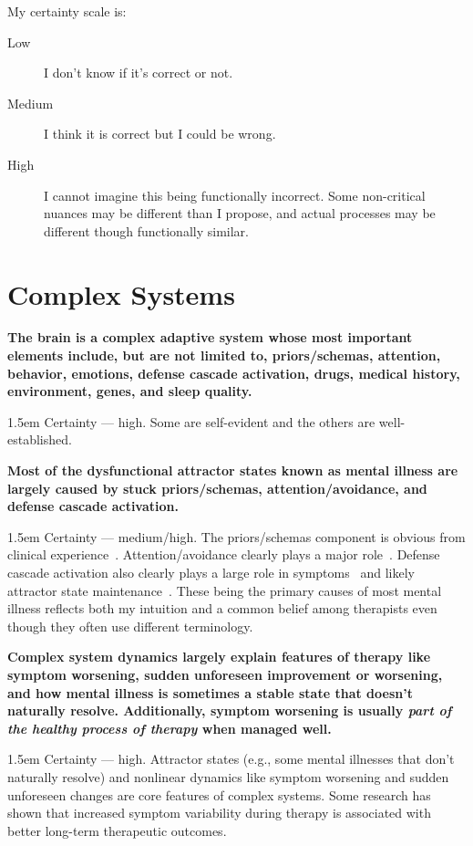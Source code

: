 \documentclass[11pt,oneside]{book}
\let\cite\parencite
\newcommand{\claim}[2]{%
    \par\medskip\noindent\textbf{#1}%
    \begin{adjustwidth}{1.5em}{}%
    \setlength{\parindent}{0pt}%
    \setlength{\parskip}{0.5\baselineskip}%
    #2%
    \end{adjustwidth}%
}
\begin{document}
My certainty scale is:
\begin{description}
    \item[Low] I don't know if it's correct or not.
    \item[Medium] I think it is correct but I could be wrong.
    \item[High] I cannot imagine this being functionally incorrect. Some non-critical nuances may be different than I propose, and actual processes may be different though functionally similar.
\end{description}

\section*{Complex Systems}
\claim{The brain is a complex adaptive system whose most important elements include, but are not limited to, priors/schemas, attention, behavior, emotions, defense cascade activation, drugs, medical history, environment, genes, and sleep quality.}{Certainty --- high. Some are self-evident and the others are well-established.}
\claim{Most of the dysfunctional attractor states known as mental illness are largely caused by stuck priors/schemas, attention/avoidance, and defense cascade activation. }{Certainty --- medium/high. The priors/schemas component is obvious from clinical experience~\cite{eckerUnlocking}. Attention/avoidance clearly plays a major role~\cite{berghBSTS}. Defense cascade activation also clearly plays a large role in symptoms~\cite{kozlowskaDefenseCascade} and likely attractor state maintenance~\cite{laniusNeurobiology}. These being the primary causes of most mental illness reflects both my intuition and a common belief among therapists even though they often use different terminology.}
\claim{Complex system dynamics largely explain features of therapy like symptom worsening, sudden unforeseen improvement or worsening, and how mental illness is sometimes a stable state that doesn't naturally resolve. Additionally, symptom worsening is usually \textit{part of the healthy process of therapy} when managed well.}{Certainty --- high. Attractor states (e.g., some mental illnesses that don't naturally resolve) and nonlinear dynamics like symptom worsening and sudden unforeseen changes are core features of complex systems. Some research has shown that increased symptom variability during therapy is associated with better long-term therapeutic outcomes.}
\end{document}

